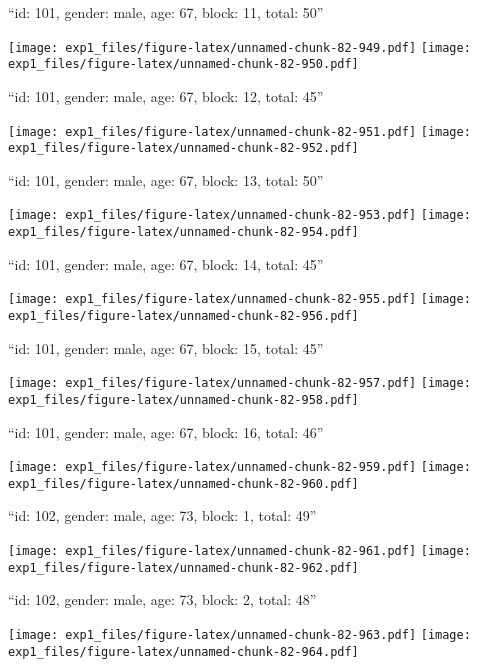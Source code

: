 \documentclass[11pt,,]{article}
\begin{document}
\newpage
[1] 

``id: 101, gender: male, age: 67, block: 11, total: 50''

\texttt{[image: exp1\_files/figure-latex/unnamed-chunk-82-949.pdf]}
\texttt{[image: exp1\_files/figure-latex/unnamed-chunk-82-950.pdf]}

\newpage
[1] 

``id: 101, gender: male, age: 67, block: 12, total: 45''

\texttt{[image: exp1\_files/figure-latex/unnamed-chunk-82-951.pdf]}
\texttt{[image: exp1\_files/figure-latex/unnamed-chunk-82-952.pdf]}

\newpage
[1] 

``id: 101, gender: male, age: 67, block: 13, total: 50''

\texttt{[image: exp1\_files/figure-latex/unnamed-chunk-82-953.pdf]}
\texttt{[image: exp1\_files/figure-latex/unnamed-chunk-82-954.pdf]}

\newpage
[1] 

``id: 101, gender: male, age: 67, block: 14, total: 45''

\texttt{[image: exp1\_files/figure-latex/unnamed-chunk-82-955.pdf]}
\texttt{[image: exp1\_files/figure-latex/unnamed-chunk-82-956.pdf]}

\newpage
[1] 

``id: 101, gender: male, age: 67, block: 15, total: 45''

\texttt{[image: exp1\_files/figure-latex/unnamed-chunk-82-957.pdf]}
\texttt{[image: exp1\_files/figure-latex/unnamed-chunk-82-958.pdf]}

\newpage
[1] 

``id: 101, gender: male, age: 67, block: 16, total: 46''

\texttt{[image: exp1\_files/figure-latex/unnamed-chunk-82-959.pdf]}
\texttt{[image: exp1\_files/figure-latex/unnamed-chunk-82-960.pdf]}

\newpage
[1] 

``id: 102, gender: male, age: 73, block: 1, total: 49''

\texttt{[image: exp1\_files/figure-latex/unnamed-chunk-82-961.pdf]}
\texttt{[image: exp1\_files/figure-latex/unnamed-chunk-82-962.pdf]}

\newpage
[1] 

``id: 102, gender: male, age: 73, block: 2, total: 48''

\texttt{[image: exp1\_files/figure-latex/unnamed-chunk-82-963.pdf]}
\texttt{[image: exp1\_files/figure-latex/unnamed-chunk-82-964.pdf]}
\end{document}
